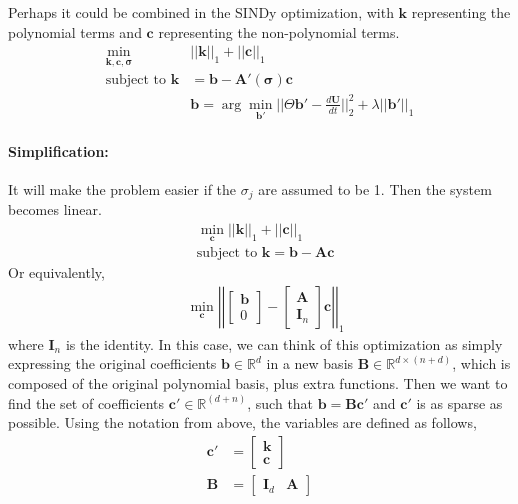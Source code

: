 \documentclass{article}
\let\vec\mathbf
\def\real{\mathbb{R}}
\begin{document}
Perhaps it could be combined in the SINDy optimization, with $\vec{k}$
representing the polynomial terms and $\vec{c}$ representing the non-polynomial
terms.
\begin{align*}
\min_{\vec{k},\vec{c},\vec{\sigma}} & ||\vec{k}||_1 + ||\vec{c}||_1
\\\text{subject to } \vec{k} &=  \vec{b} - \vec{A}'(\vec{\sigma})\vec{c}
\\ & \vec{b} = \arg \min_{\vec{b}'} ||\Theta \vec{b}' - \tfrac{d\vec{U}}{dt}||_2^2 + \lambda ||\vec{b}'||_1
\end{align*}

\paragraph{Simplification:} It will make the problem easier if the $\sigma_j$
are assumed to be 1. Then the system becomes linear.
\begin{align*}
&\min_{\vec{c}} ||\vec{k}||_1 + ||\vec{c}||_1
\\& \text{subject to } \vec{k} =  \vec{b} - \vec{A}\vec{c}
\end{align*}
Or equivalently,
\begin{align*}
&\min_{\vec{c}} \left|\left|
\begin{bmatrix} \vec{b} \\ 0 \end{bmatrix}
-
\begin{bmatrix} \vec{A} \\ \vec{I}_n \end{bmatrix}
\vec{c}
\right|\right|_1
\end{align*}
where $\vec{I}_n$ is the identity.
In this case, we can think of this optimization as simply expressing the
original coefficients $\vec{b} \in \real^d $ in a new basis $\vec{B} \in
\real^{d \times (n+d)}$, which is composed of the original polynomial basis,
plus extra functions. Then we want to find the set of coefficients $\vec{c}' \in
\real^(d+n)$, such that $\vec{b} = \vec{B} \vec{c'}$ and $\vec{c'}$ is as sparse
as possible. Using the notation from above, the variables are defined as follows,
\begin{align*}
\vec{c}' &= \begin{bmatrix} \vec{k} \\ \vec{c} \end{bmatrix} \\
\vec{B} &= \begin{bmatrix} \vec{I}_d & \vec{A} \end{bmatrix}
\end{align*}
\end{document}
